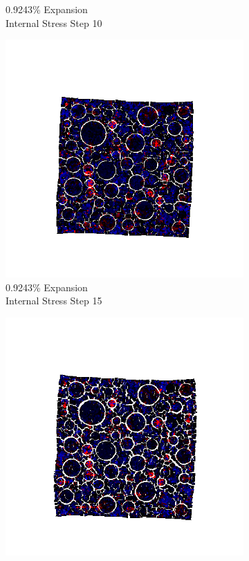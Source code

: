 \begin{figure}[ht!]
\begin{subfigure}{.25\textwidth}
      \caption{0.9243\% Expansion\\Internal Stress Step 10}
    \end{subfigure}%
    \begin{subfigure}{.25\textwidth}
      \centering
      \includegraphics[width=1.0\linewidth]{Files/exp_3D/ASR/A30P75_5_s15.png}
      \caption{0.9243\% Expansion\\Internal Stress Step 15}
    \end{subfigure}%
    \begin{subfigure}{.25\textwidth}
      \centering
      \includegraphics[width=1.0\linewidth]{Files/exp_3D/ASR/A30P75_5_stress.png}

\end{subfigure}
\end{figure}
